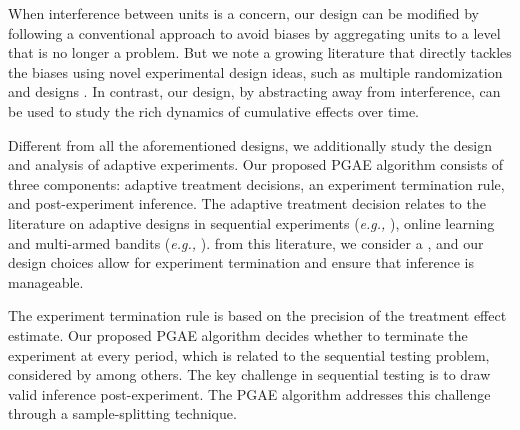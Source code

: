     
    When interference between units is a concern, our design can be modified by following a conventional approach to avoid biases  by  aggregating units to a level that  is no longer  a problem. 
    But we note a growing literature that directly tackles the biases using novel experimental design ideas, such as multiple randomization  \citep{bajari2021multiple,johari2020experimental} and designs  \citep{wager2021experimenting}. In contrast, our design, by abstracting away from interference, can be used to study the rich dynamics of cumulative effects over time. 
    



    Different from all the aforementioned designs, we additionally study the design and analysis of adaptive experiments. Our proposed PGAE algorithm consists of three components: adaptive treatment decisions, an experiment termination rule, and post-experiment inference. The adaptive treatment decision  relates to the literature on adaptive designs in sequential experiments ({\it e.g.,} \cite{efron1971forcing,bhat2019near,glynn2020adaptive}), online learning and multi-armed bandits ({\it e.g.,} \cite{bubeck2012regret,lattimore2018bandit}).  from this literature, we consider a  , and our design choices
    allow for experiment termination and ensure that inference is manageable.

    The experiment termination rule  is based on the precision of the treatment effect estimate. 
    Our proposed PGAE algorithm decides whether to terminate the experiment at every period, which is related to the sequential testing problem, considered by \cite{siegmund1985sequential,wald2004sequential,bertsekas2012dynamic,johari2017peeking,ju2019sequential} among others. The key challenge in sequential testing is to draw valid inference post-experiment. The PGAE algorithm addresses this challenge through a sample-splitting technique. 
    
